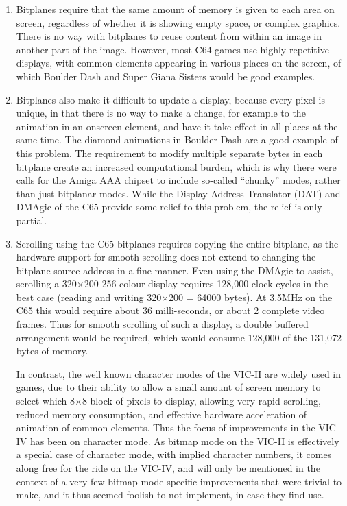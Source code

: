 \begin{enumerate}
\item Bitplanes require that the same amount of memory is given to each area on screen, regardless of whether it
is showing empty space, or complex graphics. There is no way with bitplanes to reuse content from within an image in
another part of the image.  However, most C64 games use highly repetitive displays, with common elements appearing in various
places on the screen, of which Boulder Dash and Super Giana Sisters would be good examples.

\item Bitplanes also make it difficult to update a display, because every pixel is unique, in that there is no way to make a change,
for example to the animation in an onscreen element, and have it take effect in all places at the same time. The diamond
animations in Boulder Dash are a good example of this problem.  The requirement to modify multiple separate bytes in each
bitplane create an increased computational burden, which is why there were calls for the Amiga AAA chipset to include so-called
``chunky'' modes, rather than just bitplanar modes.  While the Display Address Translator (DAT) and DMAgic of the C65 provide some
relief to this problem, the relief is only partial.

\item Scrolling using the C65 bitplanes requires copying the entire bitplane, as the hardware support for smooth scrolling does not
extend to changing the bitplane source address in a fine manner.  Even using the DMAgic to assist, scrolling a 320$\times$200 256-colour
display requires 128,000 clock cycles in the best case (reading and writing 320$\times$200 = 64000 bytes). At 3.5MHz on the C65 this
would require about 36 milli-seconds, or about 2 complete video frames.  Thus for smooth scrolling of such a display, a double
buffered arrangement would be required, which would consume 128,000 of the 131,072 bytes of memory.

In contrast, the well known character modes of the VIC-II are widely used in games, due to their ability to allow a small amount
of screen memory to select which 8$\times$8 block of pixels to display, allowing very rapid scrolling, reduced memory consumption, and
effective hardware acceleration of animation of common elements.  Thus the focus of improvements in the VIC-IV has been on
character mode.  As bitmap mode on the VIC-II is effectively a special case of character mode, with implied character numbers, it
comes along free for the ride on the VIC-IV, and will only be mentioned in the context of a very few bitmap-mode specific
improvements that were trivial to make, and it thus seemed foolish to not implement, in case they find use.

\end{enumerate}

